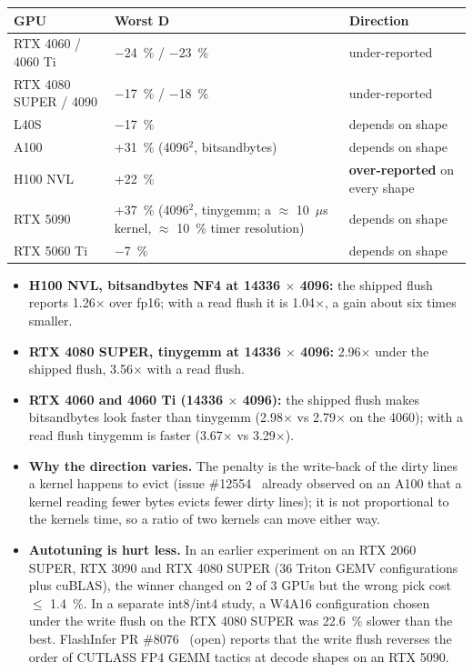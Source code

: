 \documentclass[11pt,a4paper]{article}
\providecommand{\tightlist}{\setlength{\itemsep}{0pt}\setlength{\parskip}{0pt}}
\begin{document}
{\small
\begin{longtable}[]{@{}>{\raggedright\arraybackslash}p{}>{\raggedright\arraybackslash}p{}>{\raggedright\arraybackslash}p{}@{}}
\toprule\noalign{}
GPU & Worst D & Direction \\
\midrule\noalign{}
\endhead
\bottomrule\noalign{}
\endlastfoot
RTX 4060 / 4060 Ti & \ensuremath{-}24~\% / \ensuremath{-}23~\% & under-reported \\
RTX 4080 SUPER / 4090 & \ensuremath{-}17~\% / \ensuremath{-}18~\% & under-reported \\
L40S & \ensuremath{-}17~\% & depends on shape \\
A100 & +31~\% (4096\ensuremath{^2}, bitsandbytes) & depends on shape \\
H100 NVL & +22~\% & \textbf{over-reported} on every shape \\
RTX 5090 & +37~\% (4096\ensuremath{^2}, tinygemm; a \ensuremath{\approx} 10~\ensuremath{\mu}s kernel, \ensuremath{\approx} 10~\% timer resolution) & depends on shape \\
RTX 5060 Ti & \ensuremath{-}7~\% & depends on shape \\
\end{longtable}
}

\begin{itemize}
\tightlist
\item
  \textbf{H100 NVL, bitsandbytes NF4 at 14336 \ensuremath{\times} 4096:} the shipped flush reports 1.26\ensuremath{\times} over fp16; with a read flush it
  is 1.04\ensuremath{\times}, a gain about six times smaller.
\item
  \textbf{RTX 4080 SUPER, tinygemm at 14336 \ensuremath{\times} 4096:} 2.96\ensuremath{\times} under the shipped flush, 3.56\ensuremath{\times} with a read flush.
\item
  \textbf{RTX 4060 and 4060 Ti (14336 \ensuremath{\times} 4096):} the shipped flush makes bitsandbytes look faster than tinygemm (2.98\ensuremath{\times}
  vs 2.79\ensuremath{\times} on the 4060); with a read flush tinygemm is faster (3.67\ensuremath{\times} vs 3.29\ensuremath{\times}).
\item
  \textbf{Why the direction varies.} The penalty is the write-back of the dirty lines a kernel happens to evict (issue
  \#12554~\cite{tr12554} already observed on an A100 that a kernel reading fewer bytes evicts fewer dirty lines); it is not
  proportional to the kernel\textquotesingle s time, so a ratio of two kernels can move either way.
\item
  \textbf{Autotuning is hurt less.} In an earlier experiment on an RTX 2060 SUPER, RTX 3090 and RTX 4080 SUPER (36 Triton
  GEMV configurations plus cuBLAS), the winner changed on 2 of 3 GPUs but the wrong pick cost \ensuremath{\le} 1.4~\%. In a
  separate int8/int4 study, a W4A16 configuration chosen under the write flush on the RTX 4080 SUPER was 22.6~\%
  slower than the best. FlashInfer PR \#8076~\cite{fi8076} (open) reports that the write flush reverses the order of CUTLASS FP4
  GEMM tactics at decode shapes on an RTX 5090.
\end{itemize}
\end{document}
